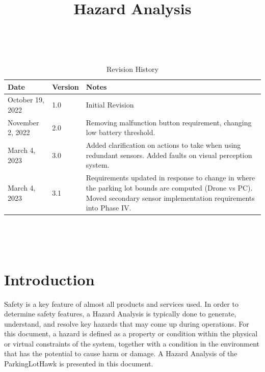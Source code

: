 \documentclass{article}
\title{Hazard Analysis\\\progname}
\author{\authname}
\date{}
\begin{document}
\maketitle
\thispagestyle{empty}

~\newpage


\begin{table}[hp]
\caption{Revision History} \label{TblRevisionHistory}
\begin{tabularx}{\textwidth}{llX}
\toprule
\toprule {\bf Date} & {\bf Version} & {\bf Notes}\\
\midrule
October 19, 2022 & 1.0 & Initial Revision \\
\midrule
November 2, 2022 & 2.0 & Removing malfunction button requirement, changing low battery threshold. \\
\midrule
March 4, 2023 & 3.0 & Added clarification on actions to take when using redundant sensors. Added faults on visual perception system. \\
\midrule
March 4, 2023 & 3.1 & Requirements updated in response to change in where the parking lot bounds are computed (Drone vs PC). Moved secondary sensor implementation requirements into Phase IV. \\
\bottomrule
\end{tabularx}
\end{table}

~\newpage

\tableofcontents

\listoftables

\listoffigures

~\newpage









\section{Introduction}

Safety is a key feature of almost all products and services used. In order to determine safety features, a Hazard Analysis is typically done to generate, understand, and resolve key hazards that may come up during operations. For this document, a hazard is defined as a property or condition within the physical or virtual constraints of the system, together with a condition in the environment that has the potential to cause harm or damage. A Hazard Analysis of the ParkingLotHawk is presented in this document. 
\end{document}
